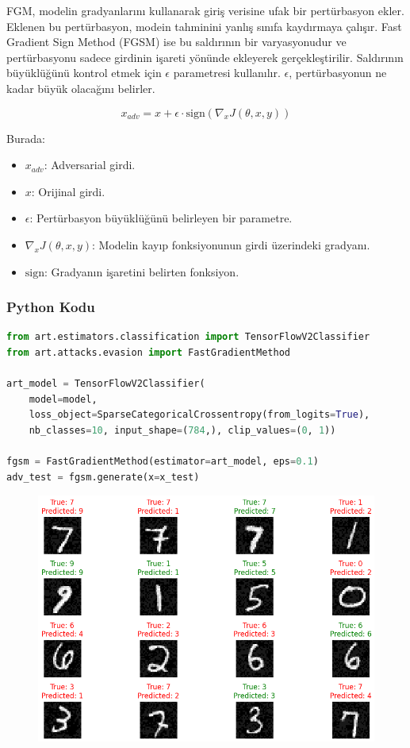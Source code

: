 FGM, modelin gradyanlarını kullanarak giriş verisine ufak bir pertürbasyon ekler. Eklenen bu pertürbasyon, modein tahminini yanlış sınıfa kaydırmaya çalışır. Fast Gradient Sign Method (FGSM) ise bu saldırının bir varyasyonudur ve pertürbasyonu sadece girdinin işareti yönünde ekleyerek gerçekleştirilir. Saldırının büyüklüğünü kontrol etmek için $\epsilon$ parametresi kullanılır. $\epsilon$, pertürbasyonun ne kadar büyük olacağını belirler.

\[ x_{adv} = x + \epsilon \cdot \text{sign}(\nabla_x J(\theta, x, y)) \]

Burada:

\begin{itemize}
    \item $x_{adv}$: Adversarial girdi.
    \item $x$: Orijinal girdi.
    \item $\epsilon$: Pertürbasyon büyüklüğünü belirleyen bir parametre.
    \item $\nabla_x J(\theta, x, y)$: Modelin kayıp fonksiyonunun girdi üzerindeki gradyanı.
    \item $\text{sign}$: Gradyanın işaretini belirten fonksiyon.
\end{itemize}

\subsubsection{Python Kodu}

\begin{lstlisting}[language=Python]
from art.estimators.classification import TensorFlowV2Classifier
from art.attacks.evasion import FastGradientMethod

art_model = TensorFlowV2Classifier(
    model=model, 
    loss_object=SparseCategoricalCrossentropy(from_logits=True), 
    nb_classes=10, input_shape=(784,), clip_values=(0, 1))

fgsm = FastGradientMethod(estimator=art_model, eps=0.1)
adv_test = fgsm.generate(x=x_test)
\end{lstlisting}

\newpage

\begin{figure}[h]
    \centering
    \includegraphics[width=1\textwidth]{images/fgm_attack_results.png}
    \caption{}
\end{figure}

